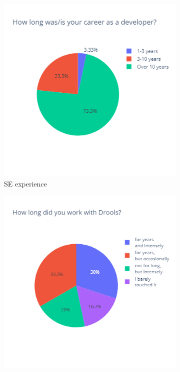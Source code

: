 \begin{figure}[H]
    \begin{subfigure}{.33\textwidth}
      \centering
      \includegraphics[width=.95\linewidth]{Sections/images/pie_experiencer.png}
      \caption{SE experience}
      \label{fig:sfig1}
    \end{subfigure}%
    \begin{subfigure}{.33\textwidth}
      \centering
      \includegraphics[width=.95\linewidth]{Sections/images/pie_droolsExperience.png}

\end{subfigure}
\end{figure}
